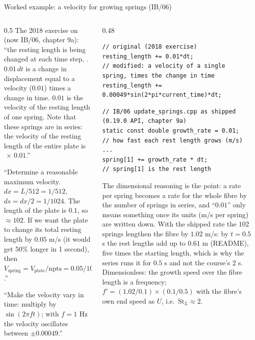 \documentclass[aspectratio=169,11pt]{beamer}
\begin{document}
\begin{frame}[fragile]{Worked example: a velocity for growing springs (IB/06)}
\label{fr:growing}
\begin{columns}[T,onlytextwidth]
\begin{column}{0.5\textwidth}
\scriptsize The 2018 exercise on  (now IB/06, chapter 9a): ``the resting length is being changed at each time step, . $0.01\,dt$ is a change in displacement equal to a velocity ($0.01$) times a change in time. $0.01$ is the velocity of the resting length of one spring. Note that these springs are in series: the velocity of the resting length of the entire plate is $\,\times\,0.01$.''
\vspace{1mm}

\scriptsize ``Determine a reasonable maximum velocity. $dx = L/512 = 1/512$, $ds = dx/2 = 1/1024$. The length of the plate is $0.1$, so  $\approx 102$. If we want the plate to change its total resting length by $0.05$ m/s (it would get 50\% longer in 1 second), then $V_{\mathrm{spring}} = V_{\mathrm{plate}}/\mathrm{npts} = 0.05/102 = 0.00049$.''
\vspace{1mm}

\scriptsize ``Make the velocity vary in time: multiply by $\sin(2\pi f t)$; with $f = 1$ Hz the velocity oscillates between $\pm0.00049$.''
\end{column}
\begin{column}{0.48\textwidth}
\begin{lstlisting}[style=cpptiny]
// original (2018 exercise)
resting_length += 0.01*dt;
// modified: a velocity of a single spring, times the change in time
resting_length += 0.00049*sin(2*pi*current_time)*dt;
\end{lstlisting}
\begin{lstlisting}[style=cpptiny]
// IB/06 update_springs.cpp as shipped (0.19.0 API, chapter 9a)
static const double growth_rate = 0.01;   // how fast each rest length grows (m/s)
...
spring[1] += growth_rate * dt;             // spring[1] is the rest length
\end{lstlisting}
\scriptsize The dimensional reasoning is the point: a rate per spring becomes a rate for the whole fibre by the number of springs in series, and ``$0.01$'' only means something once its units (m/s per spring) are written down. With the shipped rate the 102 springs lengthen the fibre by $1.02$ m/s: by $t = 0.5$ s the rest lengths add up to $0.61$ m (README), five times the starting length, which is why the series runs it for $0.5$ s and not the course's 2 s.
\scriptsize Dimensionless: the growth speed over the fibre length is a frequency; $f' = (1.02/0.1)\times(0.1/0.5)$ with the fibre's own end speed as $U$, i.e.\ $\mathrm{St}_L \approx 2$.
\end{column}
\end{columns}
\end{frame}
\end{document}

